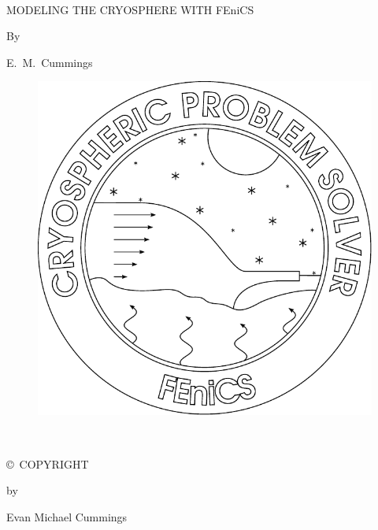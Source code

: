 \frontmatter

\pagestyle{empty}
\begin{titlepage}
  
  \begin{center}
  ~ 
  \vspace{30mm} 

  {\huge MODELING THE CRYOSPHERE WITH FEniCS}
  
  \vspace{8mm} 
  
  By
  
  \vspace{8mm}
  
  E.~M.~Cummings

  \vspace{20mm}
  
  \begin{figure}[H]
    \centering
      \includegraphics[width=0.6\linewidth]{images/cslvr_mono.pdf}
  \end{figure}
    
  \end{center}

  \newpage
  
  \begin{center}
  
  \
  
  \vspace{8cm}
  
  \copyright\ COPYRIGHT
  
  \vspace{5mm}
  
  by
  
  \vspace{5mm}
  
  Evan Michael Cummings
  

\end{center}
\end{titlepage}
